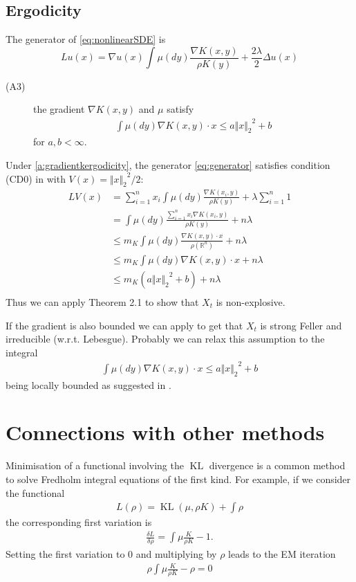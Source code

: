 \documentclass[a4paper]{article}
\theoremstyle{definition}
\DeclareMathOperator{\KL}{KL}
\newcommand{\norm}[2]{\ensuremath{\Vert #1 \Vert_{#2}}}
\def\real{\mathbb{R}}
\begin{document}
\subsection{Ergodicity}
The generator of \eqref{eq:nonlinearSDE} is
\begin{equation}
\label{eq:generator}
Lu(x) = \nabla u(x) \int\mu\left(dy\right)\frac{\nabla K(x,y)}{\rho K(y)} +\frac{2\lambda}{2}\Delta u(x) 
\end{equation}


\begin{description}
\item[(A3)\label{a:gradientkergodicity}] the gradient $\nabla K(x, y)$ and $\mu$ satisfy
\begin{align*}
\int \mu(dy)\nabla K(x, y) \cdot x \leq a\norm{x}{2}^2+b
\end{align*}
for $a, b< \infty$.
\end{description}
Under \ref{a:gradientkergodicity}, the generator \eqref{eq:generator} satisfies condition (CD0) in \cite[page 524]{meyn1993stability} with $V(x) = \norm{x}{2}^2/2$:
\begin{align*}
LV(x) &= \sum_{i=1}^n x_i \int\mu\left(dy\right)\frac{\nabla K(x_i,y)}{\rho K(y)} +\lambda\sum_{i=1}^n 1\\
&= \int\mu\left(dy\right)\frac{\sum_{i=1}^n x_i \nabla K(x_i,y)}{\rho K(y)} +n\lambda\\
&\leq m_K \int\mu\left(dy\right)\frac{\nabla K(x,y)\cdot x}{\rho (\real^n)} +n\lambda\\
&\leq m_K \int\mu\left(dy\right)\nabla K(x,y)\cdot x +n\lambda\\
&\leq m_K (a\norm{x}{2}^2+b)+n\lambda\\
\end{align*}
Thus we can apply Theorem 2.1 to show that $X_t$ is non-explosive.

If the gradient is also bounded we can apply \cite[Theorem 2.1]{bhattacharya1978criteria} to get that $X_t$ is strong Feller and irreducible (w.r.t. Lebesgue). 
Probably we can relax this assumption to the integral
\begin{align*}
\int \mu(dy)\nabla K(x, y) \cdot x \leq a\norm{x}{2}^2+b
\end{align*}
being locally bounded as suggested in \cite{roberts1996exponential}.

\section{Connections with other methods}
Minimisation of a functional involving the $\KL$ divergence is a common method to solve Fredholm integral equations of the first kind.
For example, if we consider the functional
\begin{align*}
L(\rho) = \KL(\mu, \rho K) + \int \rho
\end{align*}
the corresponding first variation is
\begin{align*}
\frac{\delta L}{\delta \rho}= \int \mu\frac{K}{\rho K} - 1.
\end{align*}
Setting the first variation to 0 and multiplying by $\rho$ leads to the EM iteration
\begin{align*}
\rho\int \mu\frac{K}{\rho K} - \rho = 0
\end{align*}
\end{document}

